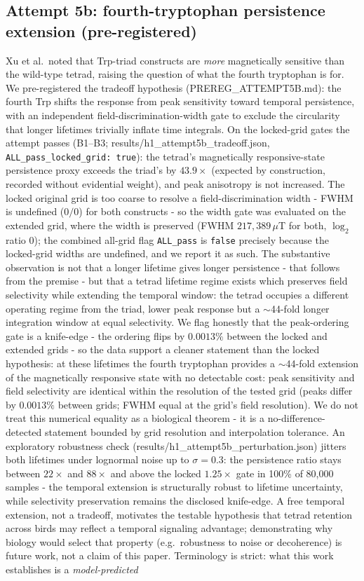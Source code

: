 \documentclass[12pt,a4paper]{article}
\begin{document}
\subsection{Attempt 5b: fourth-tryptophan persistence extension (pre-registered)}
Xu et al.\ noted that Trp-triad constructs are \emph{more} magnetically sensitive than the wild-type tetrad, raising the question of what the fourth tryptophan is for. We pre-registered the tradeoff hypothesis (PREREG\_ATTEMPT5B.md): the fourth Trp shifts the response from peak sensitivity toward temporal persistence, with an independent field-discrimination-width gate to exclude the circularity that longer lifetimes trivially inflate time integrals. On the locked-grid gates the attempt passes (B1--B3; results/h1\_attempt5b\_tradeoff.json, \texttt{ALL\_pass\_locked\_grid: true}): the tetrad's magnetically responsive-state persistence proxy exceeds the triad's by $43.9\times$ (expected by construction, recorded without evidential weight), and peak anisotropy is not increased. The locked original grid is too coarse to resolve a field-discrimination width - FWHM is undefined ($0/0$) for both constructs - so the width gate was evaluated on the extended grid, where the width is preserved (FWHM $217{,}389\,\mu$T for both, $\log_2$ ratio $0$); the combined all-grid flag \texttt{ALL\_pass} is \texttt{false} precisely because the locked-grid widths are undefined, and we report it as such. The substantive observation is not that a longer lifetime gives longer persistence - that follows from the premise - but that a tetrad lifetime regime exists which preserves field selectivity while extending the temporal window: the tetrad occupies a different operating regime from the triad, lower peak response but a $\sim$44-fold longer integration window at equal selectivity. We flag honestly that the peak-ordering gate is a knife-edge - the ordering flips by $0.0013\%$ between the locked and extended grids - so the data support a cleaner statement than the locked hypothesis: at these lifetimes the fourth tryptophan provides a $\sim$44-fold extension of the magnetically responsive state with no detectable cost: peak sensitivity and field selectivity are identical within the resolution of the tested grid (peaks differ by $0.0013\%$ between grids; FWHM equal at the grid's field resolution). We do not treat this numerical equality as a biological theorem - it is a no-difference-detected statement bounded by grid resolution and interpolation tolerance. An exploratory robustness check (results/h1\_attempt5b\_perturbation.json) jitters both lifetimes under lognormal noise up to $\sigma = 0.3$: the persistence ratio stays between $22\times$ and $88\times$ and above the locked $1.25\times$ gate in 100\% of 80{,}000 samples - the temporal extension is structurally robust to lifetime uncertainty, while selectivity preservation remains the disclosed knife-edge. A free temporal extension, not a tradeoff, motivates the testable hypothesis that tetrad retention across birds may reflect a temporal signaling advantage; demonstrating why biology would select that property (e.g.\ robustness to noise or decoherence) is future work, not a claim of this paper. Terminology is strict: what this work establishes is a \emph{model-predicted} 
\end{document}
